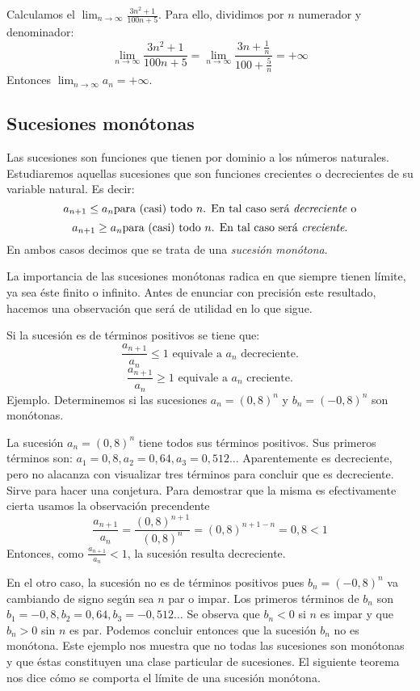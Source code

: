 \documentclass[../teoria.root.tex]{subfiles}
\begin{document}
Calculamos el \(\lim_{n\to\infty}\frac{3n^2+1}{100n+5}\).
Para ello, dividimos por \(n\) numerador y denominador:
\[\lim_{n\to\infty}\frac{3n^2+1}{100n+5}=\lim_{n\to\infty}\frac{3n+\frac{1}{n}}{100+\frac{5}{n}}=+\infty\]
Entonces \(\lim_{n\to\infty}a_n=+\infty\).
\subsection{Sucesiones monótonas}
Las sucesiones son funciones que tienen por dominio a los números naturales.
Estudiaremos aquellas sucesiones que son funciones crecientes o decrecientes de su variable natural.
Es decir:
\[a_{n+1}\leq a_n \text{para (casi) todo \(n\). En tal caso será \textit{decreciente} o}\]
\[a_{n+1}\geq a_n \text{para (casi) todo \(n\). En tal caso será \textit{creciente}.}\]
En ambos casos decimos que se trata de una \textit{sucesión monótona}.

La importancia de las sucesiones monótonas radica en que siempre tienen límite, ya sea éste finito o infinito.
Antes de enunciar con precisión este resultado, hacemos una observación que será de utilidad en lo que sigue.

Si la sucesión es de términos positivos se tiene que:
\[\frac{a_{n+1}}{a_n}\leq1\text{ equivale a \(a_n\) decreciente.}\]
\[\frac{a_{n+1}}{a_n}\geq1\text{ equivale a \(a_n\) creciente.}\]
Ejemplo.
Determinemos si las sucesiones \(a_n=(0,8)^n\) y \(b_n=(-0,8)^n\) son monótonas.

La sucesión \(a_n=(0,8)^n\) tiene todos sus términos positivos.
Sus primeros términos son: \(a_1=0,8, a_2=0,64, a_3=0,512\dots\) Aparentemente es decreciente, pero no alacanza con visualizar tres términos para concluir que es decreciente.
Sirve para hacer una conjetura.
Para demostrar que la misma es efectivamente cierta usamos la observación precendente
\[\frac{a_{n+1}}{a_n}=\frac{(0,8)^{n+1}}{(0,8)^n}=(0,8)^{n+1-n}=0,8<1\]
Entonces, como \(\frac{a_{n+1}}{a_n}<1\), la sucesión resulta decreciente.

En el otro caso, la sucesión no es de términos positivos pues \(b_n=(-0,8)^n\) va cambiando de signo según sea \(n\) par o impar.
Los primeros términos de \(b_n\) son \(b_1=-0,8, b_2=0,64, b_3=-0,512\dots\) Se observa que \(b_n<0\) si \(n\) es impar y que \(b_n>0\) sin \(n\) es par.
Podemos concluir entonces que la sucesión \(b_n\) no es monótona.
Este ejemplo nos muestra que no todas las sucesiones son monótonas y que éstas constituyen una clase particular de sucesiones.
El siguiente teorema nos dice cómo se comporta el límite de una sucesión monótona.
\end{document}
